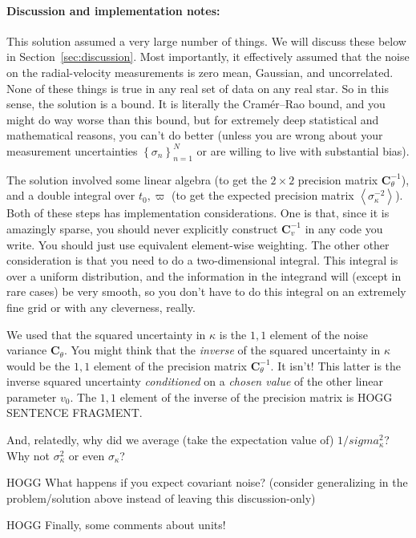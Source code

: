 \documentclass[10pt, letterpaper]{article}
\newcommand{\sectionname}{Section}
\newcommand{\inv}{^{-1}}
\newcommand{\setof}[1]{\left\{{#1}\right\}}
\newcommand{\mean}[1]{\left<{#1}\right>}
\newcommand{\tensor}[1]{\mathbf{#1}}
\newcommand{\tC}{\tensor{C}}
\newcounter{marginnote}
\renewcommand{\footnote}[1]{\refstepcounter{marginnote}\textsuperscript{\themarginnote}\marginpar{\color{darkgray}\raggedright\footnotesize\textsuperscript{\themarginnote}#1}}
\begin{document}
\paragraph{Discussion and implementation notes:}
This solution assumed a very large number of things. We will discuss these
below in \sectionname~\ref{sec:discussion}. Most importantly, it effectively
assumed that the noise on the radial-velocity measurements is zero mean,
Gaussian, and uncorrelated. None of these things is true in any real
set of data on any real star. So in this sense, the solution is a bound.
It is literally the Cram\'er--Rao bound\footnote{HOGG CITE}, and you might
do way worse than this bound, but for extremely deep statistical and
mathematical reasons, you can't do better (unless you are wrong about your
measurement uncertainties $\setof{\sigma_n}_{n=1}^N$ or are willing to live
with substantial bias).

The solution involved some linear algebra (to get the $2\times 2$
precision matrix $\tC_\theta\inv$), and a double integral over $t_0,
\varpi$ (to get the expected precision matrix
$\mean{\sigma^{-2}_\kappa}$). Both of these steps has
implementation considerations. One is that, since it
is amazingly sparse, you should never explicitly construct $\tC_v\inv$
in any code you write. You should just use equivalent element-wise
weighting.
The other other consideration is that you need to do a two-dimensional
integral. This integral is over a uniform distribution, and the information
in the integrand will (except in rare cases) be very smooth, so you don't
have to do this integral on an extremely fine grid or with any cleverness,
really.

We used that the squared uncertainty in $\kappa$ is the $1,1$ element of the
noise variance $\tC_\theta$.
You might think that the \emph{inverse} of the squared uncertainty in $\kappa$ would be
the $1,1$ element of the precision matrix $\tC_\theta\inv$.
It isn't!
This latter is the inverse squared uncertainty \emph{conditioned} on
a \emph{chosen value} of the other linear parameter $v_0$.
The $1,1$ element of the inverse of the precision matrix is HOGG SENTENCE FRAGMENT.

And, relatedly, why did we average (take the expectation value of)
$1/sigma^2_\kappa$? Why not $\sigma^2_\kappa$ or even $\sigma_\kappa$?

HOGG What happens if you expect covariant noise? (consider generalizing in the 
problem/solution above instead of leaving this discussion-only)

HOGG Finally, some comments about units!
\end{document}
